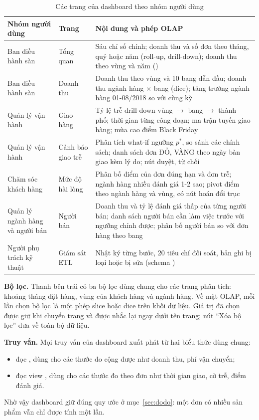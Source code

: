 \begin{table}[H]
\centering
\small{}
\caption{Các trang của dashboard theo nhóm người dùng}
\label{tab:dashboardtrang}
\begin{tabularx}{\linewidth}{|P{3.0cm}|P{2.6cm}|>{\raggedright\arraybackslash}X|}
\hline
\textbf{Nhóm người dùng} & \textbf{Trang} & \textbf{Nội dung và phép OLAP}\\ \hline
Ban điều hành sàn & Tổng quan & Sáu chỉ số chính; doanh thu và số đơn theo tháng, quý hoặc năm (roll-up, drill-down); doanh thu theo vùng và năm ()\\ \hline
Ban điều hành sàn & Doanh thu & Doanh thu theo vùng và 10 bang dẫn đầu; doanh thu ngành hàng $\times$ bang (dice); tăng trưởng ngành hàng 01-08/2018 so với cùng kỳ\\ \hline
Quản lý vận hành & Giao hàng & Tỷ lệ trễ drill-down vùng $\rightarrow$ bang $\rightarrow$ thành phố; thời gian từng công đoạn; ma trận tuyến giao hàng; mùa cao điểm Black Friday\\ \hline
Quản lý vận hành & Cảnh báo giao trễ & Phân tích what-if ngưỡng $p^{*}$, so sánh các chính sách; danh sách đơn ĐỎ, VÀNG theo ngày bàn giao kèm lý do; nút duyệt, từ chối\\ \hline
Chăm sóc khách hàng & Mức độ hài lòng & Phân bố điểm của đơn đúng hạn và đơn trễ; ngành hàng nhiều đánh giá 1-2 sao; pivot điểm theo ngành hàng và vùng, có nút hoán đổi trục\\ \hline
Quản lý ngành hàng và người bán & Người bán & Doanh thu và tỷ lệ đánh giá thấp của từng người bán; danh sách người bán cần làm việc trước với ngưỡng chỉnh được; phân bố người bán so với đơn hàng theo bang\\ \hline
Người phụ trách kỹ thuật & Giám sát ETL & Nhật ký từng bước, 20 tiêu chí đối soát, bản ghi bị loại hoặc bị sửa (schema )\\ \hline
\end{tabularx}
\end{table}

\textbf{Bộ lọc.} Thanh bên trái có ba bộ lọc dùng chung cho các trang phân tích: khoảng tháng đặt hàng, vùng của khách hàng và ngành hàng. Về mặt OLAP, mỗi lần chọn bộ lọc là một phép slice hoặc dice trên khối dữ liệu. Giá trị đã chọn được giữ khi chuyển trang và được nhắc lại ngay dưới tên trang; nút ``Xóa bộ lọc'' đưa về toàn bộ dữ liệu.

\textbf{Truy vấn.} Mọi truy vấn của dashboard xuất phát từ hai biểu thức  dùng chung:
\begin{itemize}
    \item {} đọc , dùng cho các thước đo cộng được như doanh thu, phí vận chuyển;
    \item {} đọc view , dùng cho các thước đo theo đơn như thời gian giao, cờ trễ, điểm đánh giá.
\end{itemize}
Nhờ vậy dashboard giữ đúng quy ước ở mục~\ref{sec:dodo}: một đơn có nhiều sản phẩm vẫn chỉ được tính một lần.

